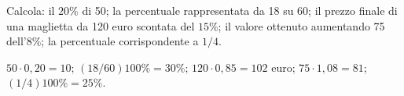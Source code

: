 
\begin{esercizio}
Calcola: il $20\%$ di 50; la percentuale rappresentata da 18 su 60; il prezzo finale di una maglietta da 120 euro scontata del $15\%$; il valore ottenuto aumentando 75 dell'$8\%$; la percentuale corrispondente a $1/4$.
\end{esercizio}

\begin{soluzione}
$50\cdot0{,}20=10$; $(18/60)100\%=30\%$; $120\cdot0{,}85=102$ euro; $75\cdot1{,}08=81$; $(1/4)100\%=25\%$.
\end{soluzione}
